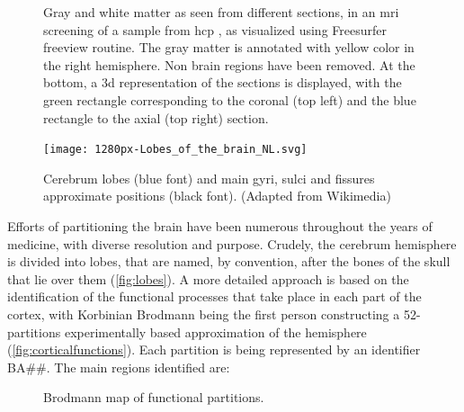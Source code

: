 \begin{figure}[H]
	\begin{minipage}{.5\linewidth}
	\centering
	\end{minipage}%
	\begin{minipage}{.5\linewidth}
	\centering
	\end{minipage}\par\medskip
	\centering
	\caption[\Ac{mri} screening of gray and white matter]{Gray and white matter as seen from different sections, in an \ac{mri} screening of a sample from \ac{hcp} \cite{VanEssen2013}, as visualized using Freesurfer freeview routine. The gray matter is annotated with yellow color in the right hemisphere. Non brain regions have been removed. At the bottom, a \ac{3d} representation of the sections is displayed, with the green rectangle corresponding to the coronal (top left) and the blue rectangle to the axial (top right) section.}
	\label{fig:cerebissection}
\end{figure}



\begin{figure}[H]
	\centering
	\texttt{[image: 1280px-Lobes\_of\_the\_brain\_NL.svg]}
	\caption[A crude cerebrum partitioning]{Cerebrum lobes (blue font) and main gyri, sulci and fissures approximate positions (black font). (Adapted from Wikimedia)}
	\label{fig:lobes}
\end{figure}

Efforts of partitioning the brain have been numerous throughout the years of medicine, with diverse resolution and purpose. Crudely, the cerebrum hemisphere is divided into lobes, that are named, by convention, after the bones of the skull that lie over them (\autoref{fig:lobes}).  A more detailed approach is based on the identification of the functional processes that take place in each part of the cortex, with Korbinian Brodmann being the first person constructing a 52-partitions experimentally based approximation of the hemisphere \cite{Brodmann1909} (\autoref{fig:corticalfunctions}). Each partition is being represented by an identifier BA\#\#. The main regions identified are:

\begin{figure}[H]
	\centering
	\caption{Brodmann map of functional partitions.}
	\label{fig:corticalfunctions}
\end{figure}


